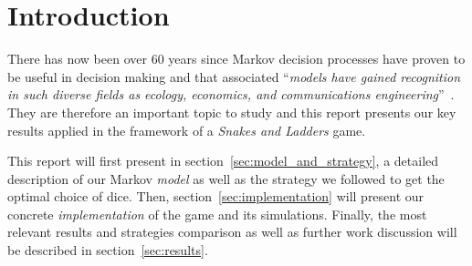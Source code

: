\section{Introduction} %
\label{sec:introduction}
There has now been over 60 years since Markov decision processes have proven to
be useful in decision making and that associated \enquote{\textit{models have 
gained recognition in such diverse fields as ecology, economics,
and communications engineering}}~\cite{puterman2014markov}.
They are therefore an important topic to study and this report presents
our key results applied in the framework of a \emph{Snakes and Ladders} game.

This report will first present in section~\ref{sec:model_and_strategy},
a detailed description of our Markov \emph{model}
as well as the strategy we followed to get the optimal choice of dice.
Then, section~\ref{sec:implementation} will present our concrete \emph{implementation}
of the game and its simulations.
Finally, the most relevant results and strategies comparison as well as
further work discussion will be described in section~\ref{sec:results}.

